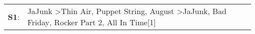 \begin{supertabular}{p{0.03\textwidth}p{0.92\textwidth}}
 \textbf{S1}:  &  JaJunk\textsuperscript{} \textgreater \enspace Thin Air\textsuperscript{}, \enspace Puppet String\textsuperscript{}, \enspace August\textsuperscript{} \textgreater \enspace JaJunk\textsuperscript{}, \enspace Bad Friday\textsuperscript{}, \enspace Rocker Part 2\textsuperscript{}, \enspace All In Time[1]\textsuperscript{}  \enspace  \\
\end{supertabular}
